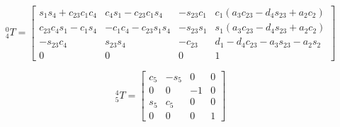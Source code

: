 \begin{equation} \label{eq:T40}
    {_4^{0}}T=\begin{bmatrix}
        s_1s_4+c_{23}c_1c_4 & c_4s_1-c_{23}c_1s_4  & -s_{23}c_1 & c_1\left(a_3c_{23}-d_4s_{23}+a_2c_2\right) \\
        c_{23}c_4s_1-c_1s_4 & -c_1c_4-c_{23}s_1s_4 & -s_{23}s_1 & s_1\left(a_3c_{23}-d_4s_{23}+a_2c_2\right) \\
        -s_{23}c_4          & s_{23}s_4            & -c_{23}    & d_1-d_4c_{23}-a_3s_{23}-a_2s_2             \\
        0                   & 0                    & 0          & 1
    \end{bmatrix}
\end{equation}

\begin{equation} \label{eq:T54}
    {_5^{4}}T=\begin{bmatrix}
        c_5 & -s_5 & 0  & 0 \\
        0   & 0    & -1 & 0 \\
        s_5 & c_5  & 0  & 0 \\
        0   & 0    & 0  & 1
    \end{bmatrix}
\end{equation}

